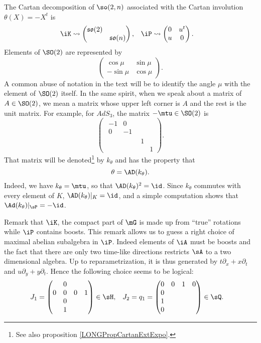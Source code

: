 The Cartan decomposition of $\so(2,n)$ associated with the Cartan involution $\theta(X)=-X^t$ is
\begin{align}\label{K_et_P}
   \iK&\leadsto
\begin{pmatrix}
\mathfrak{so}(2) \\
 & \mathfrak{so}(n)
\end{pmatrix},
&\iP&\leadsto\begin{pmatrix}
0 & u^t \\
u & 0
\end{pmatrix}.
\end{align}
 Elements of $\SO(2)$ are represented by
\[ 
  \begin{pmatrix}
\cos\mu&\sin\mu\\
-\sin\mu&\cos\mu
\end{pmatrix}.
\]
A common abuse of notation in the text will be to identify the angle $\mu$ with the element of $\SO(2)$ itself. In the same spirit, when we speak about a matrix of $A\in \SO(2)$, we mean a matrix whose upper left corner is $A$ and the rest is the unit matrix. For example, for $AdS_3$, the matrix $-\mtu\in \SO(2)$ is
\[
\begin{pmatrix}
\begin{matrix}
-1&0\\
0&-1
\end{matrix}\\
&1\\
&&1
\end{pmatrix}.
\]
That matrix will be denoted\footnote{See also proposition \ref{LONGPropCartanExtExpo}.} by $k_{\theta}$ and has the property that
\begin{equation}
	\theta=\AD(k_{\theta}).
\end{equation}
Indeed, we have $k_{\theta}=\mtu$, so that $\AD(k_{\theta})^2=\id$. Since $k_{\theta}$ commutes with every element of $K$, $\AD(k_{\theta})|_{K}=\id$, and a simple computation shows that $\Ad(k_{\theta})|_{\sP}=-\id$.

Remark that $\iK$, the compact part of $\mG$ is made up from ``true'' rotations while $\iP$ contains boosts.  This remark allows us to guess a right choice of maximal abelian subalgebra in $\iP$. Indeed elements of $\iA$ must be boosts and the fact that there are only two time-like directions restricts $\sA$ to a two dimensional algebra. Up to reparametrization, it is thus generated by $t\partial_x+x\partial_t$ and $u\partial_y+y\partial_t$. Hence the following choice seems to be logical:
\begin{align}   \label{EqDevineA}
   J_1&=
\begin{pmatrix}
&0\\
0&0&0&1\\
&0\\
&1
\end{pmatrix}\in\sH,
&J_2&=q_1=
\begin{pmatrix}
0&0&1&0\\
0\\
1\\
0
\end{pmatrix}\in\sQ.
\end{align}

